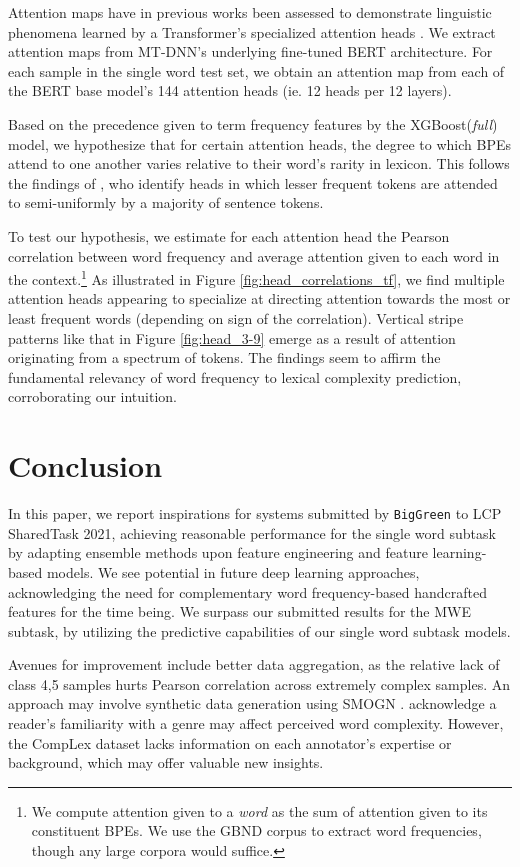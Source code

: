 \documentclass[11pt,a4paper]{article}
\begin{document}
Attention maps have in previous works been assessed to demonstrate linguistic phenomena learned by a Transformer's specialized attention heads \citep{190509418, 190604341}. We extract attention maps from MT-DNN's underlying fine-tuned BERT architecture. For each sample in the single word test set, we obtain an attention map from each of the BERT base model's 144 attention heads (ie. 12 heads per 12 layers).

Based on the precedence given to term frequency features by the XGBoost(\textit{full}) model, we hypothesize that for certain attention heads, the degree to which BPEs attend to one another varies relative to their word's rarity in lexicon. This follows the findings of \citet{190509418}, who identify heads in which lesser frequent tokens are attended to semi-uniformly by a majority of sentence tokens. 

To test our hypothesis, we estimate for each attention head the Pearson correlation between word frequency and average attention given to each word in the context.\footnote{We compute attention given to a \textit{word} as the sum of attention given to its constituent BPEs. We use the GBND corpus to extract word frequencies, though any large corpora would suffice.} As illustrated in Figure \ref{fig:head_correlations_tf}, we find multiple attention heads appearing to specialize at directing attention towards the most or least frequent words (depending on sign of the correlation). Vertical stripe patterns like that in Figure \ref{fig:head_3-9} emerge as a result of attention originating from a spectrum of tokens. The findings seem to affirm the fundamental relevancy of word frequency to lexical complexity prediction, corroborating our intuition.

\section{Conclusion}

In this paper, we report inspirations for systems submitted by \texttt{BigGreen} to LCP SharedTask 2021, achieving reasonable performance for the single word subtask by adapting ensemble methods upon feature engineering and feature learning-based models. We see potential in future deep learning approaches, acknowledging the need for complementary word frequency-based handcrafted features for the time being. We surpass our submitted results for the MWE subtask, by utilizing the predictive capabilities of our single word subtask models.

Avenues for improvement include better data aggregation, as the relative lack of class 4,5 samples hurts Pearson correlation across extremely complex samples. An approach may involve synthetic data generation using SMOGN \citep{pmlrv74branco17a}. \citet{shardlow2020complex} acknowledge a reader's familiarity with a genre may affect perceived word complexity. However, the CompLex dataset lacks information on each annotator's expertise or background, which may offer valuable new insights.




\end{document}
